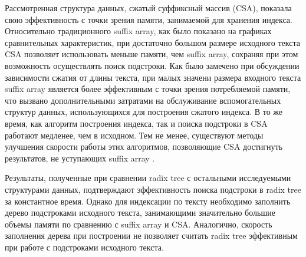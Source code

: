 
Рассмотренная структура данных, сжатый суффиксный массив (CSA), показала свою эффективность
с точки зрения памяти, занимаемой для хранения индекса. Относительно традиционного
suffix array, как было показано на графиках сравнительных характеристик,
при достаточно большом размере исходного текста CSA позволяет использовать меньше памяти, чем
suffix array, сохраняя при этом возможность осуществлять поиск подстроки.
Как было замечено при обсуждении зависимости сжатия от длины текста,
при малых значени размера входного текста suffix array является более эффективным с точки
зрения потребляемой памяти, что вызвано дополнительными затратами на обслуживание
вспомогательных структур данных, использующихся для построения сжатого индекса.
В то же время, как алгоритм построения индекса, так и поиска подстроки в CSA работают
медленее, чем в исходном. Тем не менее, существуют методы улучшения скорости
работы этих алгоритмов, позволяющие CSA достигнуть результатов, не уступающих suffix array \cite{andersensimple}.

Результаты, полученные при сравнении radix tree с остальными исследуемыми структурами данных,
подтверждают эффективность поиска подстроки в radix tree за константное время. Однако
для индексации по тексту необходимо заполнить дерево подстроками исходного текста,
занимающими значительно большие объемы памяти по сравнению с suffix array и CSA.
Аналогично, скорость заполнения дерева при построении не позволяет считать radix tree
эффективным при работе с подстроками исходного текста.
